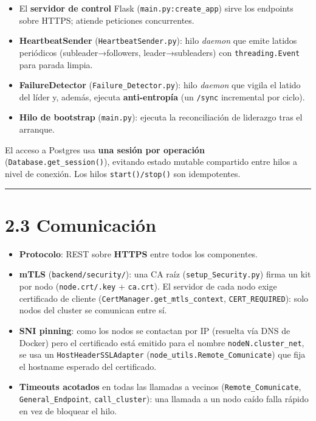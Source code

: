 \documentclass[11pt]{article}
\begin{document}
\begin{itemize}
\item El \textbf{servidor de control} Flask (\texttt{main.\allowbreak{}py:\allowbreak{}create\_\allowbreak{}app}) sirve los endpoints sobre HTTPS; atiende peticiones concurrentes.
\item \textbf{HeartbeatSender} (\texttt{HeartbeatSender.\allowbreak{}py}): hilo \emph{daemon} que emite latidos periódicos (subleader→followers, leader→subleaders) con \texttt{threading.\allowbreak{}Event} para parada limpia.
\item \textbf{FailureDetector} (\texttt{Failure\_\allowbreak{}Detector.\allowbreak{}py}): hilo \emph{daemon} que vigila el latido del líder y, además, ejecuta \textbf{anti-entropía} (un \texttt{/\allowbreak{}sync} incremental por ciclo).
\item \textbf{Hilo de bootstrap} (\texttt{main.\allowbreak{}py}): ejecuta la reconciliación de liderazgo tras el arranque.
\end{itemize}

El acceso a Postgres usa \textbf{una sesión por operación} (\texttt{Database.\allowbreak{}get\_\allowbreak{}session()}), evitando estado mutable compartido entre hilos a nivel de conexión. Los hilos \texttt{start()/\allowbreak{}stop()} son idempotentes.

\vspace{2pt}\noindent\rule{\textwidth}{0.4pt}\vspace{2pt}

\section{2.3 Comunicación}

\begin{itemize}
\item \textbf{Protocolo}: REST sobre \textbf{HTTPS} entre todos los componentes.
\item \textbf{mTLS} (\texttt{backend/\allowbreak{}security/\allowbreak{}}): una CA raíz (\texttt{setup\_\allowbreak{}Security.\allowbreak{}py}) firma un kit por nodo (\texttt{node.\allowbreak{}crt/\allowbreak{}.\allowbreak{}key} + \texttt{ca.\allowbreak{}crt}). El servidor de cada nodo exige certificado de cliente (\texttt{CertManager.\allowbreak{}get\_\allowbreak{}mtls\_\allowbreak{}context}, \texttt{CERT\_\allowbreak{}REQUIRED}): solo nodos del cluster se comunican entre sí.
\item \textbf{SNI pinning}: como los nodos se contactan por IP (resuelta vía DNS de Docker) pero el certificado está emitido para el nombre \texttt{nodeN.\allowbreak{}cluster\_\allowbreak{}net}, se usa un \texttt{HostHeaderSSLAdapter} (\texttt{node\_\allowbreak{}utils.\allowbreak{}Remote\_\allowbreak{}Comunicate}) que fija el hostname esperado del certificado.
\item \textbf{Timeouts acotados} en todas las llamadas a vecinos (\texttt{Remote\_\allowbreak{}Comunicate}, \texttt{General\_\allowbreak{}Endpoint}, \texttt{call\_\allowbreak{}cluster}): una llamada a un nodo caído falla rápido en vez de bloquear el hilo.
\end{itemize}
\end{document}
